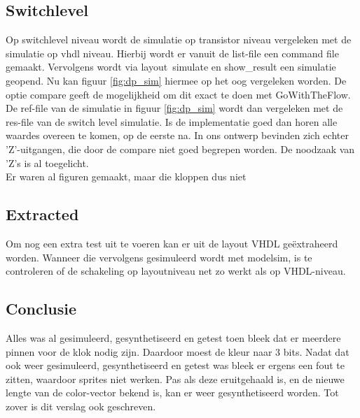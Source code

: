 \documentclass{scrartcl} %
\begin{document}
\subsection{Switchlevel}
Op switchlevel niveau wordt de simulatie op transistor niveau vergeleken met de simulatie op vhdl niveau. Hierbij wordt er vanuit de list-file een command file gemaakt. Vervolgens wordt via layout\ simulate en show\_result een simulatie geopend. Nu kan figuur \ref{fig:dp_sim} hiermee op het oog vergeleken worden. De optie compare geeft de mogelijkheid om dit exact te doen met GoWithTheFlow. De ref-file van de simulatie in figuur \ref{fig:dp_sim} wordt dan vergeleken met de res-file van de switch level simulatie. Is de implementatie goed dan horen alle waardes overeen te komen, op de eerste na. In ons ontwerp bevinden zich echter 'Z'-uitgangen, die door de compare niet goed begrepen worden. De noodzaak van 'Z's is al toegelicht. 
\\ \newline
Er waren al figuren gemaakt, maar die kloppen dus niet










\subsection{Extracted}
Om nog een extra test uit te voeren kan er uit de layout VHDL geëxtraheerd worden. Wanneer die vervolgens gesimuleerd wordt met modelsim, is te controleren of de schakeling op layoutniveau net zo werkt als op VHDL-niveau. 


\subsection{Conclusie}
Alles was al gesimuleerd, gesynthetiseerd en getest toen bleek dat er meerdere pinnen voor de klok nodig zijn. Daardoor moest de kleur naar 3 bits. Nadat dat ook weer gesimuleerd, gesynthetiseerd en getest was bleek er ergens een fout te zitten, waardoor sprites niet werken. Pas als deze eruitgehaald is, en de nieuwe lengte van de color-vector bekend is, kan er weer gesynthetiseerd worden. Tot zover is dit verslag ook geschreven. 
\end{document}
